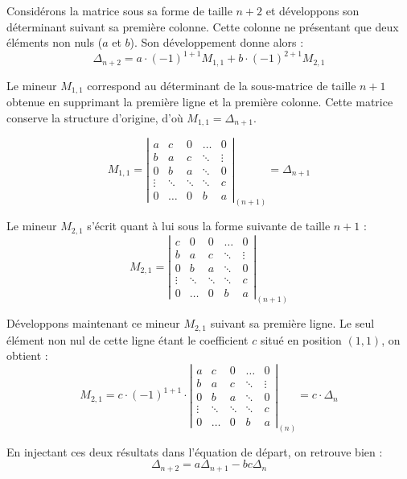 \documentclass[12pt, a4paper]{report}
\begin{document}
Considérons la matrice sous sa forme de taille $n+2$ et développons son déterminant suivant sa première colonne. Cette colonne ne présentant que deux éléments non nuls ($a$ et $b$). Son développement donne alors :
$$\Delta_{n+2} = a \cdot (-1)^{1+1} M_{1,1} + b \cdot (-1)^{2+1} M_{2,1}$$

Le mineur $M_{1,1}$ correspond au déterminant de la sous-matrice de taille $n+1$ obtenue en supprimant la première ligne et la première colonne. Cette matrice conserve la structure d'origine, d'où $M_{1,1} = \Delta_{n+1}$.

$$M_{1,1} = \left|\begin{matrix} 
    a & c & 0 & \dots & 0 \\
    b & a & c & \ddots & \vdots \\
    0 & b & a & \ddots & 0 \\
    \vdots & \ddots & \ddots & \ddots & c \\
    0 & \dots & 0 & b & a
\end{matrix}\right|_{(n+1)} = \Delta_{n+1}$$

Le mineur $M_{2,1}$ s'écrit quant à lui sous la forme suivante de taille $n+1$ :
$$M_{2,1} = \left|\begin{matrix} 
    c & 0 & 0 & \dots & 0 \\
    b & a & c & \ddots & \vdots \\
    0 & b & a & \ddots & 0 \\
    \vdots & \ddots & \ddots & \ddots & c \\
    0 & \dots & 0 & b & a 
\end{matrix}\right|_{(n+1)}$$

Développons maintenant ce mineur $M_{2,1}$ suivant sa première ligne. Le seul élément non nul de cette ligne étant le coefficient $c$ situé en position $(1,1)$, on obtient :
$$M_{2,1} = c \cdot (-1)^{1+1} \cdot \left|\begin{matrix} 
    a & c & 0 & \dots & 0 \\
    b & a & c & \ddots & \vdots \\
    0 & b & a & \ddots & 0 \\
    \vdots & \ddots & \ddots & \ddots & c \\
    0 & \dots & 0 & b & a 
\end{matrix}\right|_{(n)} = c \cdot \Delta_n$$

En injectant ces deux résultats dans l'équation de départ, on retrouve bien :
$$\Delta_{n+2} = a\Delta_{n+1} - bc\Delta_n$$
\end{document}
